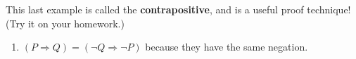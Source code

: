 \documentclass[12pt, reqno]{amsart}
\begin{document}
\vspace{10pt}

This last example is called the \textbf{contrapositive}, and is a useful proof technique! (Try it on your homework.)
\\

\begin{enumerate}
\item[] $(P \Rightarrow Q) = (\neg Q \Rightarrow \neg P)$ because they have the same negation.
\end{enumerate}
\end{document}
